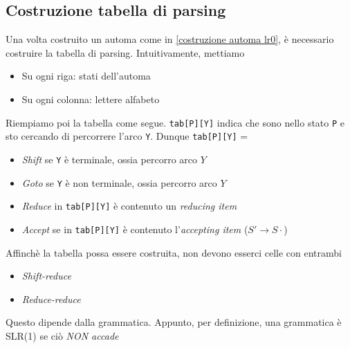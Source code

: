 \subsection{Costruzione tabella di parsing}\label{costruzione tabella parsing lr0}
Una volta costruito un automa come in \ref{costruzione automa lr0}, è necessario costruire la tabella di parsing. Intuitivamente, mettiamo
\begin{itemize}
	\item Su ogni riga: stati dell'automa
	\item Su ogni colonna: lettere alfabeto
\end{itemize}
Riempiamo poi la tabella come segue. \verb|tab[P][Y]| indica che sono nello stato \verb|P| e sto cercando di percorrere l'arco \verb|Y|. Dunque \verb|tab[P][Y]| =
\begin{itemize}
	\item \textit{Shift} se \verb|Y| è terminale, ossia percorro arco $ Y $
	\item \textit{Goto} se \verb|Y| è non terminale, ossia percorro arco $ Y $
	\item \textit{Reduce} in \verb|tab[P][Y]| è contenuto un \textit{reducing item}
	\item \textit{Accept} se in \verb|tab[P][Y]| è contenuto l'\textit{accepting item} ($ S' \rightarrow S\cdot  $)
\end{itemize}
Affinchè la tabella possa essere costruita, non devono esserci celle con entrambi
\begin{itemize}
	\item \textit{Shift-reduce}
	\item \textit{Reduce-reduce}
\end{itemize}
Questo dipende dalla grammatica. Appunto, per definizione, una grammatica è SLR(1) se ciò \textit{NON accade}
